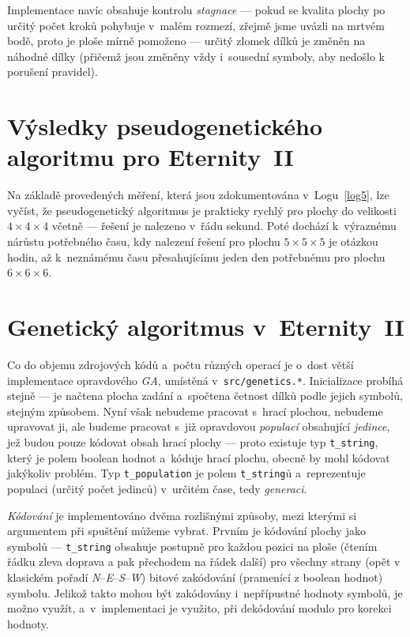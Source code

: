 \documentclass[11pt, titlepage]{report}
\begin{document}
Implementace navíc obsahuje kontrolu \emph{stagnace} --- pokud se kvalita plochy po určitý počet kroků pohybuje v~malém rozmezí, zřejmě jsme uvázli na mrtvém bodě, proto je ploše mírně pomoženo --- určitý zlomek dílků je změněn na náhodné dílky (přičemž jsou změněny vždy i~sousední symboly, aby nedošlo k porušení pravidel).

\section{Výsledky pseudogenetického algoritmu pro Eternity~II}
\label{sec:ga-pseudo-vysl}

Na základě provedených měření, která jsou zdokumentována v~Logu~\ref{log5}, lze vyčíst, že pseudogenetický algoritmus je prakticky rychlý pro plochy do velikosti $4 \times 4 \times 4$ včetně --- řešení je nalezeno v~řádu sekund. Poté dochází k~výraznému nárůstu potřebného času, kdy nalezení řešení pro plochu $5 \times 5 \times 5$ je otázkou hodin, až k~neznámému času přesahujícímu jeden den potřebnému pro plochu $6 \times 6 \times 6$.

\section{Genetický algoritmus v~Eternity~II}
\label{sec:ga-ga}

Co do objemu zdrojových kódů a~počtu různých operací je o~dost větší implementace opravdového \emph{GA}, umístěná v~\texttt{src/genetics.*}. Inicializace probíhá stejně --- je načtena plocha zadání a~spočtena četnost dílků podle jejich symbolů, stejným způsobem. Nyní však nebudeme pracovat s~hrací plochou, nebudeme upravovat ji, ale budeme pracovat s~již opravdovou \emph{populací} obsahující \emph{jedince}, jež budou pouze kódovat obsah hrací plochy --- proto existuje typ \texttt{t\_string}, který je polem boolean hodnot a~kóduje hrací plochu, obecně by mohl kódovat jakýkoliv problém. Typ \texttt{t\_population} je polem \texttt{t\_string}ů a~reprezentuje populaci (určitý počet jedinců) v~určitém čase, tedy \emph{generaci}.

\emph{Kódování} je implementováno dvěma rozlišnými způsoby, mezi kterými si argumentem při spuštění můžeme vybrat. Prvním je kódování plochy jako symbolů --- \texttt{t\_string} obsahuje postupně pro každou pozici na ploše (čtením řádku zleva doprava a pak přechodem na řádek další) pro všechny strany (opět v klasickém pořadí \emph{N}--\emph{E}--\emph{S}--\emph{W}) bitové zakódování (pramenící z boolean hodnot) symbolu. Jelikož takto mohou být zakódovány i~nepřípustné hodnoty symbolů, je možno využít, a~v~implementaci je využito, při dekódování modulo pro korekci hodnoty.
\end{document}
